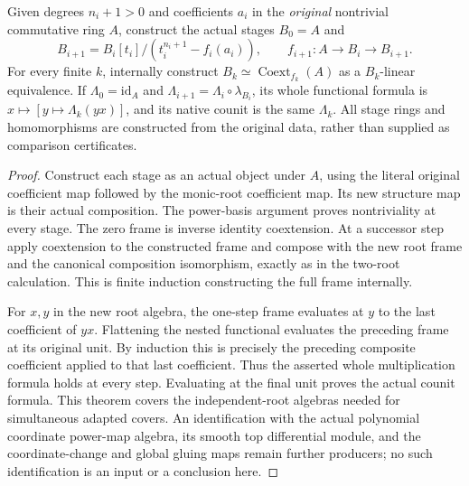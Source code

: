 \begin{theorem}
\label{thm:kn-nadel-finite-root-tower-duality}
\leanok
Given degrees $n_i+1>0$ and coefficients $a_i$ in the \emph{original}
nontrivial commutative ring $A$, construct the actual stages
$B_0=A$ and
\[
 B_{i+1}=B_i[t_i]/(t_i^{n_i+1}-f_i(a_i)),\qquad
 f_{i+1}:A\longrightarrow B_i\longrightarrow B_{i+1}.
\]
For every finite $k$, internally construct
$B_k\simeq\operatorname{Coext}_{f_k}(A)$ as a $B_k$-linear
equivalence.  If $\Lambda_0=\mathrm{id}_A$ and
$\Lambda_{i+1}=\Lambda_i\circ\lambda_{B_i}$, its whole functional
formula is $x\mapsto[y\mapsto\Lambda_k(yx)]$, and its native
counit is the same $\Lambda_k$.  All stage rings and homomorphisms
are constructed from the original data, rather than supplied as
comparison certificates.
\end{theorem}
\begin{proof}
Construct each stage as an actual object under $A$, using the
literal original coefficient map followed by the monic-root
coefficient map.  Its new structure map is their actual composition.
The power-basis argument proves nontriviality at every stage.
The zero frame is inverse identity coextension.  At a successor
step apply coextension to the constructed frame and
compose with the new root frame and the canonical composition
isomorphism, exactly as in the two-root calculation.  This is
finite induction constructing the full frame internally.

For $x,y$ in the new root algebra, the one-step frame evaluates at
$y$ to the last coefficient of $yx$.  Flattening the nested
functional evaluates the preceding frame at its original unit.
By induction this is precisely the preceding composite coefficient
applied to that last coefficient.  Thus the asserted whole
multiplication formula holds at every step.  Evaluating at the
final unit proves the actual counit formula.  This theorem covers
the independent-root algebras needed for simultaneous adapted
covers.  An identification with the actual polynomial coordinate
power-map algebra, its smooth top differential module, and the
coordinate-change and global gluing maps remain further producers;
no such identification is an input or a conclusion here.
\end{proof}
